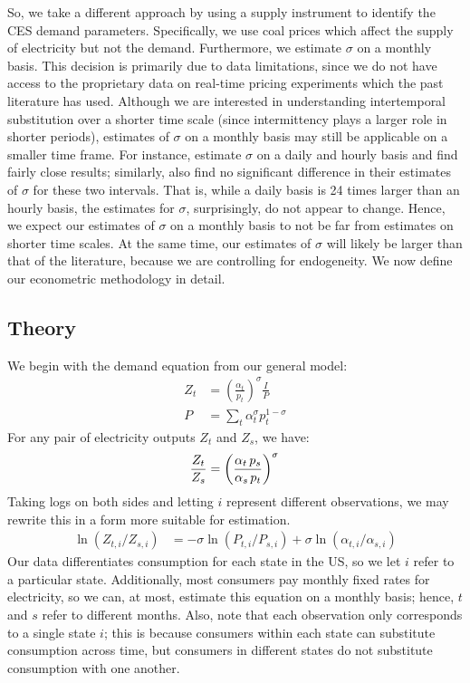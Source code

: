\documentclass[11pt,a4paper,leqno]{extarticle}
\begin{document}
	So, we take a different approach by using a supply instrument to identify the CES demand parameters. Specifically, we use coal prices which affect the supply of electricity but not the demand. Furthermore, we estimate $\sigma$ on a monthly basis. This decision is primarily due to data limitations, since we do  not have access to the proprietary data on real-time pricing experiments which the past literature has used. Although we are interested in understanding intertemporal substitution over a shorter time scale (since intermittency plays a larger role in shorter periods), estimates of $\sigma$ on a monthly basis may still be applicable on a smaller time frame. For instance, \citet{Schwarz} estimate $\sigma$ on a daily and hourly basis and find fairly close results; similarly, \citet{Herriges} also find no significant difference in their estimates of $\sigma$ for these two intervals. That is, while a daily basis is 24 times larger than an hourly basis, the estimates for $\sigma$, surprisingly, do not appear to change. Hence, we expect our estimates of $\sigma$ on a monthly basis to not be far from estimates on shorter time scales. At the same time, our estimates of $\sigma$ will likely be larger than that of the literature, because we are controlling for endogeneity. We now define our econometric methodology in detail.
	
	\subsection{Theory}
	
	
	We begin with the demand equation from our general model:
	\begin{align}
	Z_t &= \left(\frac{\alpha_t}{p_t} \right)^\sigma \frac{I}{P} \\
	P &= \sum_t \alpha_t^\sigma p_t^{1-\sigma}
	\end{align}
	For any pair of electricity outputs $Z_t$ and $Z_s$, we have:
	$$\frac{Z_t}{Z_s} = \left(\frac{\alpha_t \, p_s}{\alpha_s \, p_t} \right)^\sigma \\$$
	Taking logs on both sides and letting $i$ represent different observations, we may rewrite this in a form more suitable for estimation. 
	\begin{align}
	\ln (Z_{t, i} / Z_{ s, i}) &= -\sigma \ln (P_{t,i} / P_{s,i}) + \sigma \ln (\alpha_{t,i} / \alpha_{s,i}) 
	\end{align}
	Our data differentiates consumption for each state in the US, so we let $i$ refer to a particular state. Additionally, most consumers pay monthly fixed rates for electricity, so we can, at most, estimate this equation on a monthly basis; hence, $t$ and $s$ refer to different months. Also, note that each observation only corresponds to a single state $i$; this is because consumers within each state can substitute consumption across time, but consumers in different states do not substitute consumption with one another. 
	
\end{document}
